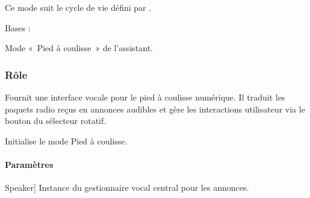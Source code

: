 \documentclass[letterpaper,10pt,french]{sphinxmanual}
\begin{document}
\sphinxAtStartPar
Ce mode suit le cycle de vie défini par .

\begin{fulllineitems}
\label{\detokenize{api/modes:modes.mode_caliper.ModeCaliper}}
\pysigstartsignatures
\pysiglinewithargsret
{}
{}
{}
\pysigstopsignatures
\sphinxAtStartPar
Bases : {\hyperref[\detokenize{api/core:core.mode_base.Mode}]{}}

\sphinxAtStartPar
Mode « Pied à coulisse » de l’assistant.


\subsubsection{Rôle}
\label{\detokenize{api/modes:role}}
\sphinxAtStartPar
Fournit une interface vocale pour le pied à coulisse numérique. Il traduit
les paquets radio reçus en annonces audibles et gère les interactions
utilisateur via le bouton du sélecteur rotatif.

\begin{fulllineitems}
\label{\detokenize{api/modes:modes.mode_caliper.ModeCaliper.__init__}}
\pysigstartsignatures
\pysiglinewithargsret
{}
{}
{}
\pysigstopsignatures
\sphinxAtStartPar
Initialise le mode Pied à coulisse.


\paragraph{Paramètres}
\label{\detokenize{api/modes:parametres}}\begin{description}
\sphinxlineitem{speaker}{[}Speaker{]}
\sphinxAtStartPar
Instance du gestionnaire vocal central pour les annonces.


\end{description}
\end{fulllineitems}
\end{fulllineitems}
\end{document}
